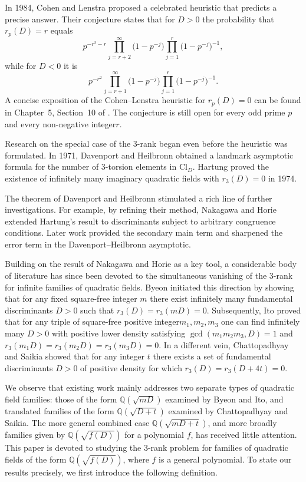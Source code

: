 \documentclass{amsart}
\begin{document}
In 1984, Cohen and Lenstra \cite{cl} proposed a celebrated heuristic that predicts a precise answer. Their conjecture states that for \(D > 0\) the probability that \(r_{p}(D) = r\) equals
\[
p^{-r^{2}-r}\prod_{j=r+2}^{\infty}\bigl(1-p^{-j}\bigr)\prod_{j=1}^{r}\bigl(1-p^{-j}\bigr)^{-1},
\]
while for \(D < 0\) it is
\[
p^{-r^{2}}\prod_{j=r+1}^{\infty}\bigl(1-p^{-j}\bigr)\prod_{j=1}^{r}\bigl(1-p^{-j}\bigr)^{-1}.
\]
A concise exposition of the Cohen--Lenstra heuristic for $r_p(D)=0$ can be found in Chapter~5, Section~10 of \cite{co}. The conjecture is still open for every odd prime \(p\) and every non-negative integer\(r\).

Research on the special case of the \(3\)-rank began even before the heuristic was formulated. In 1971, Davenport and Heilbronn \cite{dh}  obtained a landmark asymptotic formula for the number of \(3\)-torsion elements in \(\mathrm{Cl}_{D}\).  Hartung \cite{ha} proved the existence of infinitely many imaginary quadratic fields with \(r_{3}(D) = 0\) in 1974.  

The theorem of Davenport and Heilbronn stimulated a rich line of further investigations. For example, by refining their method, Nakagawa and Horie \cite{nh}   extended Hartung’s result to discriminants subject to arbitrary congruence conditions. Later work \cite{bst, btt, tt} provided the secondary main term and sharpened the error term in the Davenport--Heilbronn asymptotic.

Building on the result of Nakagawa and Horie as a key tool, a considerable body of literature has since been devoted to the simultaneous vanishing of the \(3\)-rank for infinite families of quadratic fields. Byeon \cite{by} initiated this direction by showing that for any fixed square-free integer \(m\) there exist infinitely many fundamental discriminants \(D > 0\) such that \(r_{3}(D)=r_{3}(mD)=0\). Subsequently, Ito \cite{it} proved that for any triple of square-free positive integer\(m_{1}, m_{2}, m_{3}\) one can find infinitely many \(D > 0\) with positive lower density satisfying \(\gcd(m_{1}m_{2}m_{3}, D) = 1\) and \(r_{3}(m_{1}D) = r_{3}(m_{2}D) = r_{3}(m_{3}D) = 0\). In a different vein, Chattopadhyay and Saikia \cite{cs} showed that for any integer \(t\) there exists a set of fundamental discriminants \(D > 0\) of positive density for which \(r_{3}(D)=r_{3}(D + 4t)=0\).

We observe that existing work mainly addresses two separate types of quadratic field families: those of the form \(\mathbb{Q}(\sqrt{mD})\) examined by Byeon and Ito, and translated families of the form \(\mathbb{Q}(\sqrt{D + t})\) examined by Chattopadhyay and Saikia. The more general combined case \(\mathbb{Q}(\sqrt{mD + t})\), and more broadly families given by \(\mathbb{Q}(\sqrt{f(D)})\) for a polynomial \(f\), has received little attention. This paper is devoted to studying the \(3\)-rank problem for families of quadratic fields of the form \(\mathbb{Q}(\sqrt{f(D)})\), where \(f\) is a general polynomial. To state our results precisely, we first introduce the following definition.
\end{document}
